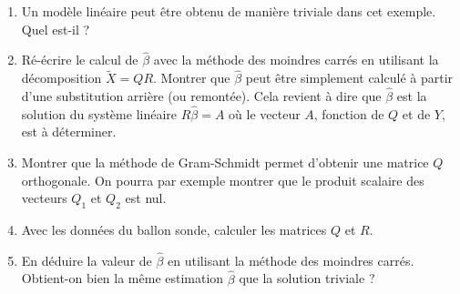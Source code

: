 \documentclass[solutions]{../exercices}
\begin{document}
\begin{exercice}
\begin{enumerate}
	\item Un modèle linéaire peut être obtenu de manière triviale dans cet exemple. Quel est-il ?
	\item Ré-écrire le calcul de $\hat{\beta}$ avec la méthode des moindres carrés en utilisant la décomposition $\tilde{X} = QR$. Montrer que $\hat{\beta}$ peut être simplement calculé à partir d'une substitution arrière (ou remontée). Cela revient à dire que $\hat{\beta}$ est la solution du système linéaire $R \hat{\beta} = A$ où le vecteur $A$, fonction de $Q$ et de $Y$, est à déterminer.
	\item Montrer que la méthode de Gram-Schmidt permet d'obtenir une matrice $Q$ orthogonale. On pourra par exemple montrer que le produit scalaire des vecteurs $Q_1$ et $Q_2$ est nul.
	\item Avec les données du ballon sonde, calculer les matrices $Q$ et $R$.
	\item En déduire la valeur de $\hat{\beta}$ en utilisant la méthode des moindres carrés. Obtient-on bien la même estimation $\hat{\beta}$ que la solution triviale ?
\end{enumerate}
\end{exercice}
\end{document}
